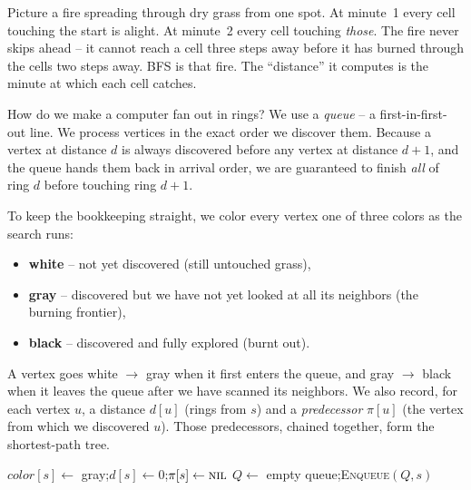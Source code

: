 \begin{intuitionbox}
Picture a fire spreading through dry grass from one spot. At minute~1 every cell
touching the start is alight. At minute~2 every cell touching \emph{those}. The
fire never skips ahead -- it cannot reach a cell three steps away before it has
burned through the cells two steps away. BFS is that fire. The ``distance'' it
computes is the minute at which each cell catches.
\end{intuitionbox}

How do we make a computer fan out in rings? We use a \emph{queue} -- a
first-in-first-out line. We process vertices in the exact order we discover
them. Because a vertex at distance $d$ is always discovered before any vertex at
distance $d+1$, and the queue hands them back in arrival order, we are
guaranteed to finish \emph{all} of ring $d$ before touching ring $d+1$.

To keep the bookkeeping straight, we color every vertex one of three colors as
the search runs:
\begin{itemize}
\item \textbf{white} -- not yet discovered (still untouched grass),
\item \textbf{gray} -- discovered but we have not yet looked at all its
neighbors (the burning frontier),
\item \textbf{black} -- discovered and fully explored (burnt out).
\end{itemize}
A vertex goes white $\to$ gray when it first enters the queue, and gray $\to$
black when it leaves the queue after we have scanned its neighbors. We also
record, for each vertex $u$, a distance $d[u]$ (rings from $s$) and a
\emph{predecessor} $\pi[u]$ (the vertex from which we discovered $u$). Those
predecessors, chained together, form the shortest-path tree.

\begin{algorithm}[H]
\caption{BFS$(G, s)$}
$\mathit{color}[s] \gets$ gray;\quad $d[s] \gets 0$;\quad $\pi[s] \gets \textsc{nil}$\;
$Q \gets$ empty queue;\quad \textsc{Enqueue}$(Q, s)$\;
\end{algorithm}

